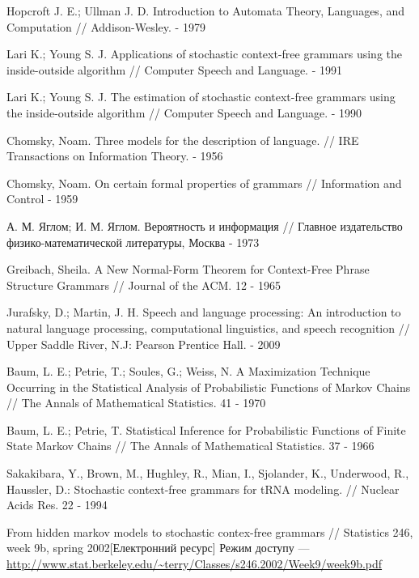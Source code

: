 \begin{thebibliography}
    Hopcroft J. E.; Ullman J. D. Introduction to Automata Theory, Languages, and Computation // Addison-Wesley. - 1979

    Lari K.; Young S. J. Applications of stochastic context-free grammars using the inside-outside algorithm // Computer Speech and Language. - 1991

    Lari K.; Young S. J. The estimation of stochastic context-free grammars using the inside-outside algorithm // Computer Speech and Language. - 1990

    Chomsky, Noam. Three models for the description of language. // IRE Transactions on Information Theory. - 1956

    Chomsky, Noam. On certain formal properties of grammars // Information and Control - 1959

    А. М. Яглом; И. М. Яглом. Вероятность и информация // Главное издательство физико-математической литературы, Москва - 1973

    Greibach, Sheila. A New Normal-Form Theorem for Context-Free Phrase Structure Grammars // Journal of the ACM. 12 - 1965

    Jurafsky, D.; Martin, J. H. Speech and language processing: An introduction to natural language processing, computational linguistics, and speech recognition // Upper Saddle River, N.J: Pearson Prentice Hall. - 2009

    Baum, L. E.; Petrie, T.; Soules, G.; Weiss, N. A Maximization Technique Occurring in the Statistical Analysis of Probabilistic Functions of Markov Chains // The Annals of Mathematical Statistics. 41 - 1970

    Baum, L. E.; Petrie, T. Statistical Inference for Probabilistic Functions of Finite State Markov Chains // The Annals of Mathematical Statistics. 37 - 1966

    Sakakibara, Y., Brown, M., Hughley, R., Mian, I., Sjolander, K., Underwood, R., Haussler, D.: Stochastic context-free grammars for tRNA modeling. // Nuclear Acids Res. 22 - 1994

    From hidden markov models to stochastic contex-free grammars // Statistics 246, week 9b, spring 2002[Електронний ресурс] Режим доступу --- \url{http://www.stat.berkeley.edu/~terry/Classes/s246.2002/Week9/week9b.pdf}


\end{thebibliography}
